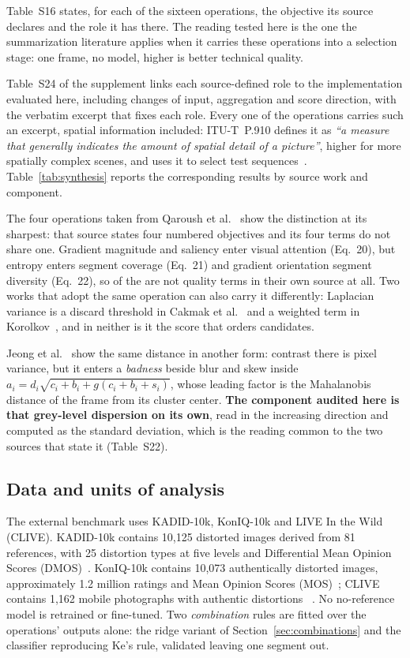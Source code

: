 Table~S16 states, for each of the sixteen operations, the objective its
source declares and the role it has there. The reading tested here is the one the summarization literature applies when it carries
these operations into a selection stage: one frame, no model, higher is better technical
quality.

Table~S24 of the supplement links each source-defined role to the implementation
evaluated here, including changes of input, aggregation and score direction, with the
verbatim excerpt that fixes each role. Every one of the \autVerificadas{} operations carries such an excerpt, spatial
information included: ITU-T~P.910 defines it as \emph{``a measure that generally indicates
the amount of spatial detail of a picture''}, higher for more spatially complex scenes, and
uses it to select test sequences~\citep{itu_p910}.
Table~\ref{tab:synthesis} reports the corresponding results by source work and component.

The four operations taken from Qaroush et al.~\citep{qaroush2025diversity} show the distinction at its sharpest: that
source states four numbered objectives and its four terms do not share one. Gradient
magnitude and saliency enter visual attention (Eq.~20), but entropy enters segment coverage
(Eq.~21) and gradient orientation segment diversity (Eq.~22), so \qaroushFora{} of the
\qaroushDe{} are not quality terms in their own source at all. Two works that adopt the same operation can also carry it
differently: Laplacian variance is a discard threshold in Cakmak et
al.~\citep{cakmak2025tripss} and a weighted term in Korolkov~\citep{korolkov2025keyframe},
and in neither is it the score that orders candidates.

Jeong et al.~\citep{jeong2016static} show the same distance in another form: contrast there
is pixel variance, but it enters a \emph{badness} beside blur and skew inside
$a_i=d_i\sqrt{c_i+b_i+g(c_i+b_i+s_i)}$, whose leading factor is the Mahalanobis distance of
the frame from its cluster center. \textbf{The component audited here is that grey-level
dispersion on its own}, read in the increasing direction and computed as the standard
deviation, which is the reading common to the two sources that state it (Table~S22).


\subsection{Data and units of analysis}\label{sec:data}

The external benchmark uses KADID-10k, KonIQ-10k and LIVE In the Wild (CLIVE).
KADID-10k contains 10,125 distorted images derived from 81 references, with 25
distortion types at five levels and Differential Mean Opinion Scores
(DMOS)~\citep{lin2019kadid}. KonIQ-10k contains 10,073 authentically distorted
images, approximately 1.2 million ratings and Mean Opinion Scores
(MOS)~\citep{hosu2020koniq}; CLIVE
contains 1,162 mobile photographs with authentic distortions
~\citep{ghadiyaram2016clive}. No no-reference model is retrained or fine-tuned. Two \emph{combination} rules are fitted over the operations' outputs alone: the ridge variant of Section~\ref{sec:combinations} and the classifier reproducing Ke's rule, validated leaving one segment out.

